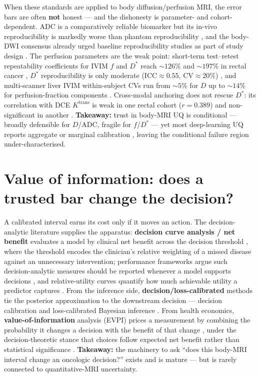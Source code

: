 \documentclass{iopjournal}
\newcommand{\Dstar}{D^{*}}
\newcommand{\Ktrans}{K^{\mathrm{trans}}}
\begin{document}
When these standards are applied to body diffusion/perfusion MRI, the error bars are
often \textbf{not} honest --- and the dishonesty is parameter- and cohort-dependent. ADC
is a comparatively reliable biomarker but its in-vivo reproducibility is markedly worse
than phantom reproducibility \cite{miquel2016}, and the body-DWI consensus already urged
baseline reproducibility studies as part of study design \cite{koh2007,padhani2009}. The
perfusion parameters are the weak point: short-term test--retest repeatability
coefficients for IVIM $f$ and $\Dstar$ reach ${\sim}126\%$ and ${\sim}197\%$ in rectal
cancer \cite{sun2017}, $\Dstar$ reproducibility is only moderate
($\mathrm{ICC}\approx0.55$, $\mathrm{CV}\approx20\%$) \cite{yang2019}, and multi-scanner
liver IVIM within-subject CVs run from ${\sim}5\%$ for $D$ up to ${\sim}14\%$ for
perfusion-fraction components \cite{simchick2024}. Cross-modal anchoring does not rescue
$\Dstar$: its correlation with DCE $\Ktrans$ is weak in one rectal cohort ($r=0.389$)
\cite{sun2019} and non-significant in another \cite{yang2019}. \textbf{Takeaway:} trust
in body-MRI UQ is conditional --- broadly defensible for $D$/ADC, fragile for
$f$/$\Dstar$ --- yet most deep-learning UQ reports aggregate or marginal calibration
\cite{casali2025}, leaving the conditional failure region under-characterised.

\section{Value of information: does a trusted bar change the decision?}
\label{sec:voi}

A calibrated interval earns its cost only if it moves an action. The decision-analytic
literature supplies the apparatus: \textbf{decision curve analysis / net benefit}
evaluates a model by clinical net benefit across the decision threshold
\cite{vickers2006,vickers2016,vickers2019}, where the threshold encodes the clinician's
relative weighting of a missed disease against an unnecessary intervention; performance
frameworks argue such decision-analytic measures should be reported whenever a model
supports decisions \cite{steyerberg2010}, and relative-utility curves quantify how much
achievable utility a predictor captures \cite{baker2009}. From the inference side,
\textbf{decision/loss-calibrated} methods tie the posterior approximation to the
downstream decision --- decision calibration \cite{zhao2021} and loss-calibrated
Bayesian inference \cite{lacostejulien2011,vadera2021}. From health economics,
\textbf{value-of-information} analysis (EVPI) prices a measurement by combining the
probability it changes a decision with the benefit of that change \cite{felli1998},
under the decision-theoretic stance that choices follow expected net benefit rather than
statistical significance \cite{claxton1999}. \textbf{Takeaway:} the machinery to ask
``does this body-MRI interval change an oncologic decision?'' exists and is mature ---
but is rarely connected to quantitative-MRI uncertainty.
\end{document}
